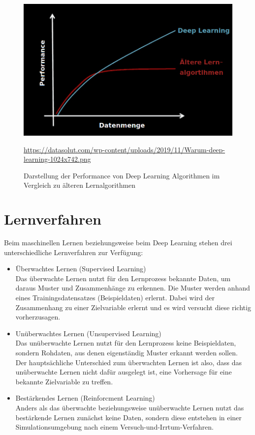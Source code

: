 \begin{figure}[H]
	\centering
	\includegraphics[scale=0.4]{kapitel3/images/Deep_Learning_Performance.png}
	\caption{Darstellung der Performance von Deep Learning Algorithmen im Vergleich zu älteren Lernalgorithmen}
	\label{deep-learning-performance}
	\vspace{0.2cm}
	\quelle\url{https://datasolut.com/wp-content/uploads/2019/11/Warum-deep-learning-1024x742.png}
\end{figure}

\section{Lernverfahren}

Beim maschinellen Lernen beziehungsweise beim Deep Learning stehen drei unterschiedliche Lernverfahren zur Verfügung:

\begin{itemize}
	
	\item Überwachtes Lernen (Supervised Learning)\\
	Das überwachte Lernen nutzt für den Lernprozess bekannte Daten, um daraus Muster und Zusammenhänge zu erkennen. Die Muster werden  anhand eines Trainingsdatensatzes (Beispieldaten) erlernt. Dabei wird der Zusammenhang zu einer Zielvariable erlernt und es wird versucht diese richtig vorherzusagen. \cite{datasolut3}
	
	\item Unüberwachtes Lernen (Unsupervised Learning)\\
	Das unüberwachte Lernen nutzt für den Lernprozess keine Beispieldaten, sondern Rohdaten, aus denen eigenständig Muster erkannt werden sollen. \\
	Der hauptsächliche Unterschied zum überwachten Lernen ist also, dass das unüberwachte Lernen nicht dafür ausgelegt ist, eine Vorhersage für eine bekannte Zielvariable zu treffen. \cite{datasolut3}
	\item Bestärkendes Lernen (Reinforcment Learning)\\
	Anders als das überwachte beziehungsweise unüberwachte Lernen nutzt das bestärkende Lernen zunächst keine Daten, sondern diese entstehen in einer Simulationsumgebung nach einem Versuch-und-Irrtum-Verfahren. \cite{der-onliner_blogspot}
\end{itemize}

